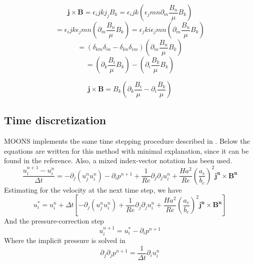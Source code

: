 \begin{equation}
\pmb{j}\times \pmb{B} = \epsilon_ijk j_j B_k = 
\epsilon_ijk \left( \epsilon_jmn \partial_m \frac{B_n}{\mu} B_k \right)
\end{equation}
\begin{equation}
= \epsilon_ijk \epsilon_jmn \left( \partial_m \frac{B_n}{\mu} B_k \right)
= \epsilon_jki \epsilon_jmn \left( \partial_m \frac{B_n}{\mu} B_k \right)
\end{equation}
\begin{equation}
= (\delta_{km} \delta_{in} - \delta_{kn} \delta_{im} ) \left( \partial_m \frac{B_n}{\mu} B_k \right)
\end{equation}
\begin{equation}
= \left( \partial_k \frac{B_i}{\mu} B_k \right) - 
\left( \partial_i \frac{B_k}{\mu} B_k \right)
\end{equation}

\begin{equation}
\pmb{j} \times \pmb{B} = B_k 
\left( \partial_k \frac{B_i}{\mu} - \partial_i \frac{B_k}{\mu} \right)
\end{equation}

\subsection{Time discretization}
MOONS implements the same time stepping procedure described in \cite{griebel1997numerical}. Below the equations are written for this method with minimal explanation, since it can be found in the reference. Also, a mixed index-vector notation has been used.
\begin{equation}
\frac{u_i^{n+1}- u_i^{n}}{\Delta t} = - \partial_j (u_j^{n} u_i^{n}) 
-\partial_i  p^{n+1} + 
\frac{1}{Re} \partial_j \partial_j u_i^{n} + 
\frac{Ha^2}{Re} \left( \frac{a_c}{b_c} \right)^2 \pmb{j^{n}} \times \pmb{B^{n}}
\end{equation}
Estimating for the velocity at the next time step, we have
\begin{equation}
u_i^* = u_i^{n} + \Delta t \left[ - \partial_j (u_j^{n} u_i^{n}) + 
\frac{1}{Re} \partial_j \partial_j u_i^{n} + 
\frac{Ha^2}{Re} \left( \frac{a_c}{b_c} \right)^2 \pmb{j^{n}} \times \pmb{B^{n}} \right]
\end{equation}
And the pressure-correction step
\begin{equation}
u_i^{n+1} = u_i^* -\partial_i p^{n+1}
\end{equation}
Where the implicit pressure is solved in
\begin{equation}
\partial_j \partial_j p^{n+1} = \frac{1}{\Delta t} \partial_i u_i^n
\end{equation}

